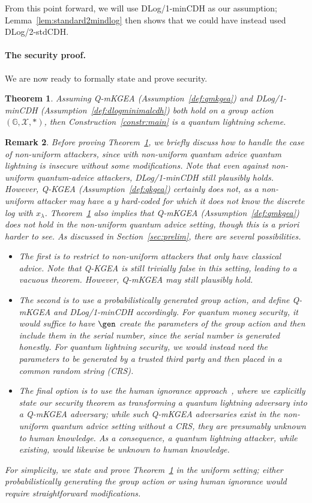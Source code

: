 \documentclass{article}\usepackage[a4paper,margin=20mm]{geometry}
\newtheorem{theorem}{Theorem}\newtheorem{lemma}[theorem]{Lemma}\newtheorem{proposition}[theorem]{Proposition}\newtheorem{corollary}[theorem]{Corollary}\newtheorem{definition}[theorem]{Definition}\newtheorem{claim}[theorem]{Claim}\newtheorem{remark}[theorem]{Remark}\newtheorem{observation}[theorem]{Observation}\newtheorem{conjecture}[theorem]{Conjecture}\newtheorem{example}[theorem]{Example}
\numberwithin{theorem}{section}
\numberwithin{equation}{section}
\newcommand{\G}{\mathbb{G}}
\newcommand{\Xs}{{\mathcal{X}}}
\begin{document}
From this point forward, we will use DLog/1-minCDH as our assumption; Lemma~\ref{lem:standard2mindlog} then shows that we could have instead used DLog/2-stdCDH.

\paragraph{The security proof.} We are now ready to formally state and prove security.

\begin{theorem}\label{thm:main2} Assuming Q-mKGEA (Assumption~\ref{def:qmkgea}) and DLog/1-minCDH (Assumption~\ref{def:dlogminimalcdh}) both hold on a group action $(\G,\Xs,*)$, then Construction~\ref{constr:main} is a quantum lightning scheme.
\end{theorem}
\begin{remark}Before proving Theorem~\ref{thm:main2}, we briefly discuss how to handle the case of non-uniform attackers, since with non-uniform quantum advice quantum lightning is insecure without some modifications. Note that even against non-uniform quantum-advice attackers, DLog/1-minCDH still plausibly holds. However, Q-KGEA (Assumption~\ref{def:qkgea}) certainly does not, as a non-uniform attacker may have a $y$ hard-coded for which it does not know the discrete log with $x_\lambda$. Theorem~\ref{thm:main2} also implies that Q-mKGEA (Assumption~\ref{def:qmkgea}) does not hold in the non-uniform quantum advice setting, though this is a priori harder to see. As discussed in Section~\ref{sec:prelim}, there are several possibilities. 
	\begin{itemize}
		\item The first is to restrict to non-uniform attackers that only have classical advice. Note that Q-KGEA is still trivially false in this setting, leading to a vacuous theorem. However, Q-mKGEA may still plausibly hold.
		\item The second is to use a probabilistically generated group action, and define Q-mKGEA and DLog/1-minCDH accordingly. For quantum money security, it would suffice to have $\gen$ create the parameters of the group action and then include them in the serial number, since the serial number is generated honestly. For quantum lightning security, we would instead need the parameters to be generated by a trusted third party and then placed in a common random string (CRS). 
		\item The final option is to use the human ignorance approach~\cite{VIETCRYPT:Rogaway06}, where we explicitly state our security theorem as transforming a quantum lightning adversary into a Q-mKGEA adversary; while such Q-mKGEA adversaries exist in the non-uniform quantum advice setting without a CRS, they are presumably unknown to human knowledge. As a consequence, a quantum lightning attacker, while existing, would likewise be unknown to human knowledge. 
	\end{itemize}
	For simplicity, we state and prove Theorem~\ref{thm:main2} in the uniform setting; either probabilistically generating the group action or using human ignorance would require straightforward modifications. 
\end{remark}
\end{document}
